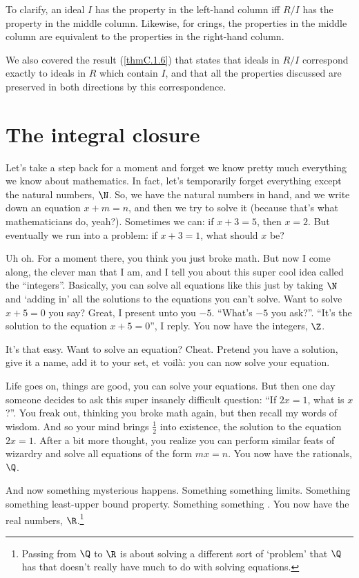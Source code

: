 \noindent
To clarify, an ideal $I$ has the property in the left-hand column iff $R/I$ has the property in the middle column.  Likewise, for crings, the properties in the middle column are equivalent to the properties in the right-hand column.

We also covered the result (\cref{thmC.1.6}) that states that ideals in $R/I$ correspond exactly to ideals in $R$ which contain $I$, and that all the properties discussed are preserved in both directions by this correspondence.

\section{The integral closure}

Let's take a step back for a moment and forget we know pretty much everything we know about mathematics.  In fact, let's temporarily forget everything except the natural numbers, $\N$.  So, we have the natural numbers in hand, and we write down an equation $x+m=n$, and then we try to solve it (because that's what mathematicians do, yeah?).  Sometimes we can:  if $x+3=5$, then $x=2$.  But eventually we run into a problem:  if $x+3=1$, what should $x$ be?

Uh oh.  For a moment there, you think you just broke math.  But now I come along, the clever man that I am, and I tell you about this super cool idea called the ``integers''.  Basically, you can solve all equations like this just by taking $\N$ and `adding in' all the solutions to the equations you can't solve.  Want to solve $x+5=0$ you say?  Great, I present unto you $-5$.  ``What's $-5$ you ask?''.  ``It's the solution to the equation $x+5=0$'', I reply.  You now have the integers, $\Z$.

It's that easy.  Want to solve an equation?  Cheat.  Pretend you have a solution, give it a name, add it to your set, et voilà:  you can now solve your equation.

Life goes on, things are good, you can solve your equations.  But then one day someone decides to ask this super insanely difficult question:  ``If $2x=1$, what is $x$?''.  You freak out, thinking you broke math again, but then recall my words of wisdom.  And so your mind brings $\frac{1}{2}$ into existence, the solution to the equation $2x=1$.  After a bit more thought, you realize you can perform similar feats of wizardry and solve all equations of the form $mx=n$.  You now have the rationals, $\Q$.

And now something mysterious happens.  Something something limits.  Something something least-upper bound property.  Something something \textellipsis .  You now have the real numbers, $\R$.\footnote{Passing from $\Q$ to $\R$ is about solving a different sort of `problem' that $\Q$ has that doesn't really have much to do with solving equations.}

